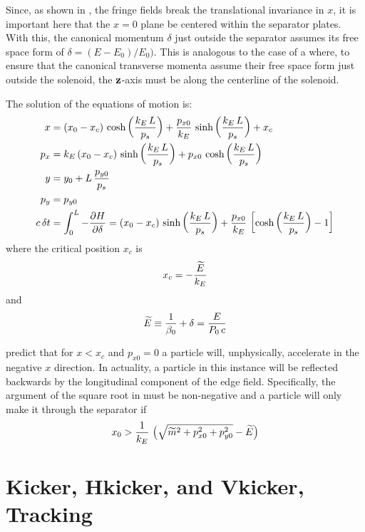 Since, as shown in , the fringe fields break the
translational invariance in $x$, it is important here that the $x = 0$
plane be centered within the separator plates. With this, the
canonical momentum $\delta$ just outside the separator assumes its
free space form of $\delta = (E - E_0) / E_0)$. This is analogous to
the case of a  where, to ensure that the canonical
transverse momenta assume their free space form just outside the
solenoid, the ${\bf z}$-axis must be along the centerline of the
solenoid.

The solution of the equations of motion is:
\begin{align}
  x   &= (x_0 - x_c) \, \cosh \left( \frac{k_E \, L}{p_s} \right) + 
         \frac{p_{x0}}{k_E} \, \sinh \left( \frac{k_E \, L}{p_s} \right) + x_c \nonumber \\
  p_x &= k_E \, (x_0 - x_c) \, \sinh \left( \frac{k_E \, L}{p_s} \right) + 
         {p_{x0}} \, \cosh \left( \frac{k_E \, L}{p_s} \right) \nonumber \\
  y   &= y_0 + L \, \frac{p_{y0}}{p_s} \label{xxlp} \\
  p_y &= p_{y0} \nonumber \\
  c \, \delta t &=  \int_0^L -\frac{\partial H}{\partial \delta}
      = (x_0 - x_c) \, \sinh \left( \frac{k_E \, L}{p_s} \right) +
        \frac{p_{x0}}{k_E} \, \left[ \cosh \left( \frac{k_E \, L}{p_s} \right) - 1 \right]
        \nonumber
\end{align}
where the critical position $x_c$ is
\begin{equation} 
  x_c = -\frac{\widetilde E}{k_E}
\end{equation}
and 
\begin{equation}
  \widetilde E \equiv \frac{1}{\beta_0} + \delta = \frac{E}{P_0 \, c}
\end{equation}
 
 predict that for $x < x_c$ and $p_{x0} = 0$ a particle will, unphysically, accelerate in
the negative $x$ direction. In actuality, a particle in this instance will be reflected backwards by
the longitudinal component of the edge field. Specifically, the argument of the square root in
 must be non-negative and a particle will only make it through the separator if
\begin{equation}
  x_0 > \frac{1}{k_E} \, \left( \sqrt{\widetilde m^2 + p_{x0}^2 + p_{y0}^2} - \widetilde E \right)
\end{equation}

\section{Kicker, Hkicker, and Vkicker, Tracking}
\label{s:kicker.std}

